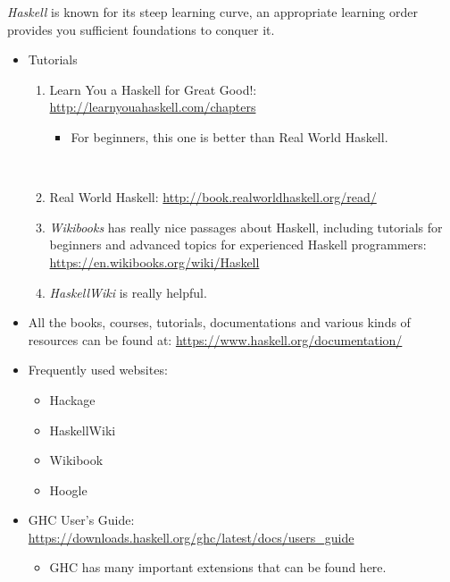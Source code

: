 \documentclass{article}
\begin{document}
\begin{itemize}
    \emph{Haskell} is known for its steep learning curve, an appropriate learning order provides you sufficient foundations to conquer it.
    \begin{itemize}
        \item Tutorials
        \begin{enumerate}
            \item Learn You a Haskell for Great Good!:
            \href{http://learnyouahaskell.com/chapters}{http://learnyouahaskell.com/chapters}
            \begin{itemize}
                \item For beginners, this one is better than Real World Haskell.
            \end{itemize}\
            \item Real World Haskell:
            \href{http://book.realworldhaskell.org/read/}{http://book.realworldhaskell.org/read/}
            \item \emph{Wikibooks} has really nice passages about Haskell, including tutorials for beginners and advanced topics for experienced Haskell programmers:\\
            \href{https://en.wikibooks.org/wiki/Haskell}{https://en.wikibooks.org/wiki/Haskell}
            \item \emph{HaskellWiki} is really helpful.
        \end{enumerate}
        \item All the books, courses, tutorials, documentations and various kinds of resources can be found at:
        \href{https://www.haskell.org/documentation/}{https://www.haskell.org/documentation/}
        \item Frequently used websites:
        \begin{itemize}
            \item Hackage
            \item HaskellWiki
            \item Wikibook
            \item Hoogle
        \end{itemize}
        \item GHC User’s Guide:\\
        \href{https://downloads.haskell.org/ghc/latest/docs/users_guide}{https://downloads.haskell.org/ghc/latest/docs/users\_guide}
        \begin{itemize}
            \item GHC has many important extensions that can be found here.

\end{itemize}
\end{itemize}
\end{itemize}
\end{document}
